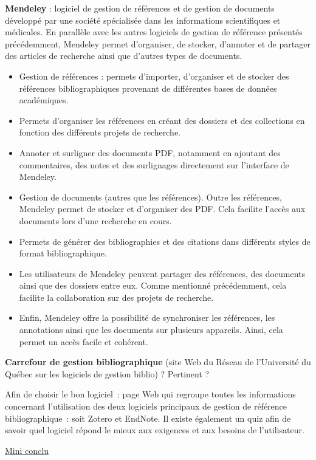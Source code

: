 \documentclass[
  letterpaper,
]{scrbook}
\begin{document}
\textbf{Mendeley} : logiciel de gestion de références et de gestion de
documents développé par une société spécialisée dans les informations
scientifiques et médicales. En parallèle avec les autres logiciels de
gestion de référence présentés précédemment, Mendeley permet
d'organiser, de stocker, d'annoter et de partager des articles de
recherche ainsi que d'autres types de documents.

\begin{itemize}
\item
  Gestion de références : permets d'importer, d'organiser et de stocker
  des références bibliographiques provenant de différentes bases de
  données académiques.
\item
  Permets d'organiser les références en créant des dossiers et des
  collections en fonction des différents projets de recherche.
\item
  Annoter et surligner des documents PDF, notamment en ajoutant des
  commentaires, des notes et des surlignages directement sur l'interface
  de Mendeley.
\item
  Gestion de documents (autres que les références). Outre les
  références, Mendeley permet de stocker et d'organiser des PDF. Cela
  facilite l'accès aux documents lors d'une recherche en cours.
\item
  Permets de générer des bibliographies et des citations dans différents
  styles de format bibliographique.
\item
  Les utilisateurs de Mendeley peuvent partager des références, des
  documents ainsi que des dossiers entre eux. Comme mentionné
  précédemment, cela facilite la collaboration sur des projets de
  recherche.
\item
  Enfin, Mendeley offre la possibilité de synchroniser les références,
  les annotations ainsi que les documents sur plusieurs appareils.
  Ainsi, cela permet un accès facile et cohérent.
\end{itemize}

\textbf{Carrefour de gestion bibliographique} (site Web du Réseau de
l'Université du Québec sur les logiciels de gestion biblio) ? Pertinent
?

Afin de choisir le bon logiciel~: page Web qui regroupe toutes les
informations concernant l'utilisation des deux logiciels principaux de
gestion de référence bibliographique~: soit Zotero et EndNote. Il existe
également un quiz afin de savoir quel logiciel répond le mieux aux
exigences et aux besoins de l'utilisateur.

\ul{Mini conclu}
\end{document}
